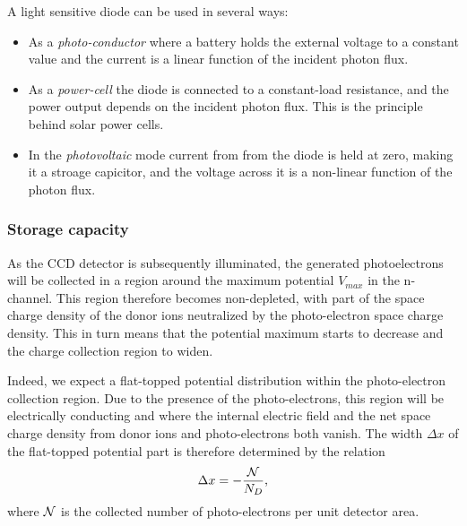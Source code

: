 \documentclass{article}
\def\cl#1{{\cal #1}}               %
\begin{document}
A light sensitive diode can be used in several ways:
\begin{itemize}
\item As a {\it photo-conductor} where a battery holds the external voltage
  to a constant value and the current is a linear function of the
  incident photon flux.
\item As a {\it power-cell} the diode is connected to a constant-load
  resistance, and the power output depends on the incident photon
  flux. This is the principle behind solar power cells.
\item In the {\it photovoltaic} mode current from from the diode
  is held at zero, making it a stroage capicitor, and the voltage
  across it is a non-linear function of the photon flux.
\end{itemize}

\subsubsection*{Storage capacity}

As the CCD detector is subsequently illuminated, the generated
photoelectrons will be collected in a region around the maximum
potential $V_{max}$ in the n-channel. This region therefore becomes
non-depleted, with part of the space charge density of the donor ions
neutralized by the photo-electron space charge density. This in turn
means that the potential maximum starts to decrease and the charge
collection region to widen. 

Indeed, we expect a flat-topped potential distribution within the
photo-electron collection region. Due to the presence of the
photo-electrons, this region will be electrically conducting and where
the internal electric field and the net space charge density
from donor ions and photo-electrons both vanish. The width $\Delta x$
of the flat-topped potential part is therefore determined by the
relation
\begin{equation}
  \Delta x = -\frac{\cl N}{N_D},
\end{equation}
where $\cl N$ is the collected number of photo-electrons per unit
detector area.
\end{document}
